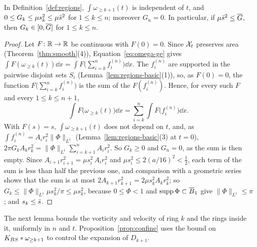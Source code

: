 \begin{lemma}
\label{lem:inner-circ}
In Definition~\ref{def:regions}, $\int\omega_{\ge k+1}(t)$ is independent of
$t$, and $0\le G_k\le\mu s_k^2\le\mu\bar s^2$ for $1\le k\le n$;
moreover $G_n=0$. In particular, if $\mu\bar s^2\le\overline{G}$, then
$G_k\in[0,\overline{G}]$ for $1\le k\le n$.
\end{lemma}
\begin{proof}
Let $F\colon\mathbb{R}\to\mathbb{R}$ be continuous with $F(0)=0$. Since $\mathcal{X}_t$ preserves
area (Theorem~\ref{thm:smooth}\textup{(4)}), Equation~\eqref{eq:omega-ge} gives
$\int F(\omega_{\ge k}(t))\dd x=\int F\big(\sum_{i=k}^nf^{(n)}_i\big)\dd x$. The
$f^{(n)}_i$ are supported in the pairwise disjoint sets $S_i$
(Lemma~\ref{lem:regions-basic}\textup{(1)}), so, as $F(0)=0$, the function
$F\big(\sum_{i=k}^nf^{(n)}_i\big)$ is the sum of the $F(f^{(n)}_i)$. Hence, for
every such $F$ and every $1\le k\le n+1$,
\begin{equation}
\label{eq:conserved}
\int F\big(\omega_{\ge k}(t)\big)\dd x=\sum_{i=k}^n\int F\big(f^{(n)}_i\big)\dd x .
\end{equation}
With $F(s)=s$, $\int\omega_{\ge k+1}(t)$ does not depend on $t$, and, as
$\int f^{(n)}_i=A_ir_i^2\|\Phi\|_{L^1}$ (Lemma~\ref{lem:regions-basic}\textup{(3)}
at $t=0$), $2\pi G_kA_kr_k^2=\|\Phi\|_{L^1}\sum_{i=k+1}^nA_ir_i^2$. So $G_k\ge0$
and $G_n=0$, as the sum is then empty. Since $A_{i+1}r_{i+1}^2=\mu s_i^2\,A_ir_i^2$ and
$\mu s_i^2\le2(a/16)^2<\frac12$, each term of the sum is less than half the
previous one, and comparison with a geometric series shows that the sum is at most
$2A_{k+1}r_{k+1}^2=2\mu s_k^2A_kr_k^2$; so
$G_k\le\|\Phi\|_{L^1}\mu s_k^2/\pi\le\mu s_k^2$, because
$0\le\Phi<1$ and $\operatorname{supp}\Phi\subset\overline B_1$ give
$\|\Phi\|_{L^1}\le\pi$; and $s_k\le\bar s$.
\end{proof}

The next lemma bounds the vorticity and velocity of ring $k$ and the rings
inside it, uniformly in $n$ and $t$. Proposition~\ref{prop:confine} uses
the bound on $K_{BS}\ast\omega_{\ge k+1}$ to control the expansion of $D_{k+1}$.

